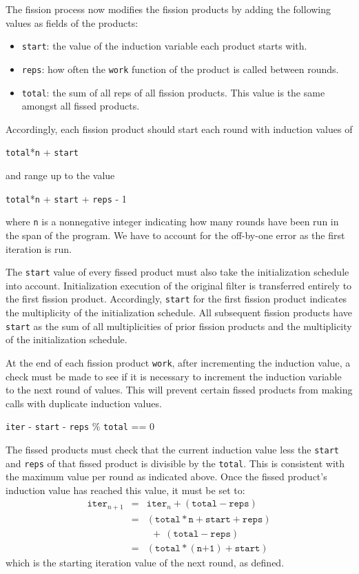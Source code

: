 The fission process now modifies the fission products by adding the
following values as fields of the products:
\begin{itemize}
    \item \texttt{start}: the value of the induction variable each product starts with.
    \item \texttt{reps}: how often the \texttt{work} function of the product is
      called between rounds.
    \item \texttt{total}: the sum of all reps of all fission products. This value is
      the same amongst all fissed products.
\end{itemize}
Accordingly, each fission product should start each round with induction values
of
\begin{center}
\texttt{total}*\texttt{n} + \texttt{start}
\end{center}
and range up to the value
\begin{center}
\texttt{total}*\texttt{n} + \texttt{start} + \texttt{reps} - 1
\end{center}
where \texttt{n} is a nonnegative integer indicating how many rounds have
been run in the span of the program.  We have to account for the off-by-one
error as the first iteration is run.

The \texttt{start} value of every fissed product must also take the initialization schedule into account.  Initialization execution of the original filter is transferred entirely to the first fission product.  Accordingly, \texttt{start} for the first fission product indicates the multiplicity of the initialization schedule.  All subsequent fission products have \texttt{start} as the sum of all multiplicities of prior fission products and the multiplicity of the initialization schedule.

At the end of each fission product \texttt{work}, after incrementing the
induction value, a check must be made to see if it is necessary to increment
the induction variable to the next round of  values.  This will prevent certain
fissed products from making calls with duplicate induction values.
\begin{center}
\texttt{iter} - \texttt{start} - \texttt{reps} \% \texttt{total} == 0
\end{center}
The fissed products must check that the current induction value less the
\texttt{start} and \texttt{reps} of that fissed product is divisible by the
\texttt{total}.  This is consistent with the maximum value per round as
indicated above.  Once the fissed product's induction value has reached
this value, it must be set to:
\begin{eqnarray*}
\texttt{iter}_{n+1} &=& \texttt{iter}_{n} + (\texttt{total} - \texttt{reps}) \\
&=& (\texttt{total}*\texttt{n} + \texttt{start} + \texttt{reps}) \\
&&  \ \ +\ (\texttt{total} - \texttt{reps}) \\
&=& (\texttt{total}*(\texttt{n+1}) + \texttt{start})
\end{eqnarray*}
which is the starting iteration value of the next round, as defined.

